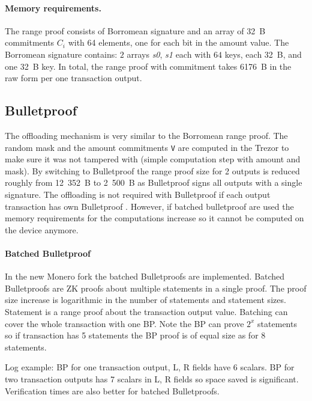 \documentclass[]{article}
\begin{document}
\paragraph{Memory requirements.} 
The range proof consists of Borromean signature and an array of 32~B commitments $C_i$ with 64 elements, one for each bit in the amount value. The Borromean signature contains: $2$ arrays \emph{s0}, \emph{s1} each with $64$ keys, each 32~B, and one 32~B key. In total, the range proof with commitment takes 6176~B in the raw form per one transaction output.

\subsection{Bulletproof}\label{sec:bp} The offloading mechanism is very similar to the Borromean range proof. The random mask and the amount commitments \verb|V| are computed in the Trezor to make sure it was not tampered with (simple computation step with amount and mask). 
By switching to Bulletproof the range proof size for 2 outputs is reduced roughly from 12~352~B to 2~500~B as Bulletproof signs all outputs with a single signature. The offloading is not required with Bulletproof if each output transaction has own Bulletproof \cite{Bnz2017BulletproofsSP}. However, if batched bulletproof are used the memory requirements for the computations increase so it cannot be computed on the device anymore. 

\paragraph{Batched Bulletproof} 
In the new Monero fork the batched Bulletproofs are implemented. Batched Bulletproofs are ZK proofs about multiple statements in a single proof. The proof size increase is logarithmic in the number of statements and statement sizes. Statement is a range proof about the transaction output value. Batching can cover the whole transaction with one BP. Note the BP can prove $2^x$ statements so if transaction has 5 statements the BP proof is of equal size as for 8 statements.

Log example: BP for one transaction output, L, R fields have 6 scalars. BP for two transaction outputs has 7 scalars in L, R fields so space saved is significant. Verification times are also better for batched Bulletproofs.
\end{document}

